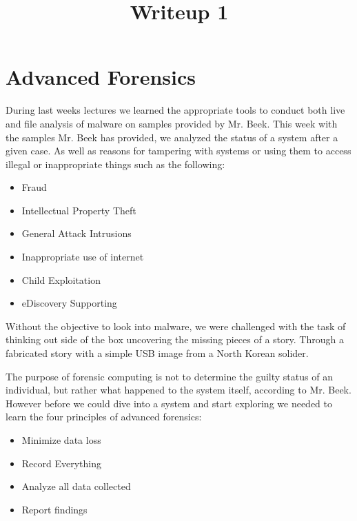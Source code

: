 \documentclass[letterpaper,12pt,titlepage,onecolumn]{IEEEtran}
\author{\name}
\title{Writeup 1}
\begin{document}
\maketitle
\hrulefill

\section{Advanced Forensics}
During last weeks lectures we learned the appropriate tools to conduct both live and file analysis of malware on samples provided by Mr. Beek. This week with the samples Mr. Beek has provided, we analyzed the status of a system after a given case. As well as reasons for tampering with systems or using them to access illegal or inappropriate things such as the following:

\begin{itemize}
    \item Fraud
    \item Intellectual Property Theft
    \item General Attack Intrusions
    \item Inappropriate use of internet
    \item Child Exploitation
    \item eDiscovery Supporting
\end{itemize}

Without the objective to look into malware, we were challenged with the task of thinking out side of the box uncovering the missing pieces of a story. Through a fabricated story with a simple USB image from a North Korean solider.\par

The purpose of forensic computing is not to determine the guilty status of an individual, but rather what happened to the system itself, according to Mr. Beek. However before we could dive into a system and start exploring we needed to learn the four principles of advanced forensics:
\begin{itemize}
    \item Minimize data loss
    \item Record Everything
    \item Analyze all data collected
    \item Report findings
\end{itemize}
\end{document}
